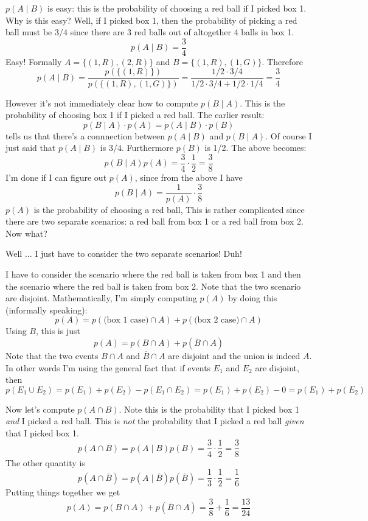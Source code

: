 $p(A\mid B)$ is easy: this is the probability of choosing a red ball if 
I picked box 1.
Why is this easy? Well, if I picked box 1,
then the probability of picking a red
ball must be $3/4$ since there are 3 red balls out of altogether 4 
balls in box 1.
\[
p(A \mid B) = \frac{3}{4}
\]
Easy!
Formally
$A = \{(1, R), (2, R)\}$
and $B = \{(1, R), (1, G)\}$.
Therefore
\[
p(A \mid B) = \frac{p(\{(1, R)\})}{p(\{(1, R), (1, G)\})}
= \frac{1/2 \cdot 3/4}{1/2 \cdot 3/4 + 1/2 \cdot 1/4}
= \frac{3}{4}
\]




However it's not immediately clear how to compute $p(B\mid A)$.
This is the probability of choosing box 1 if I picked a red ball.
The earlier result:
\[
p(B \mid  A) \cdot p(A)
=
p(A \mid  B) \cdot p(B) 
\]
tells us that there's a connnection between $p(A\mid B)$ and $p(B\mid A)$.
Of course I just said that $p(A\mid B)$ is $3/4$.
Furthermore $p(B)$ is 1/2.
The above becomes:
\[
p(B \mid  A) p(A)
= 
\frac{3}{4} \cdot \frac{1}{2} = \frac{3}{8}
\]
I'm done if I can figure out $p(A)$, since from the above I have
\[
p(B \mid  A)
= 
\frac{1}{p(A)} \cdot \frac{3}{8}
\]
$p(A)$ is the probability of choosing a red ball,
This is rather complicated since there are two separate scenarios:
a red ball from box 1 or a red ball from box 2.
Now what?

Well ... I just have to consider the two separate scenarios! Duh!

I have to consider the scenario where the red ball is taken from box 1
and then the scenario where the red ball is taken from box 2.
Note that the two scenario are disjoint.
Mathematically, I'm simply computing $p(A)$ 
by doing this (informally speaking):
\[
p(A) = p(\text{(box 1 case)} \cap A) + p(\text{(box 2 case)} \cap A)
\] 
Using $B$, this is just
\[
p(A) = p(B \cap A) + p(\overline B \cap A) 
\] 
Note that the two events 
$B \cap A$ and 
$\overline B \cap A$
are disjoint and the union is indeed $A$.
In other words I'm using the general fact that if events 
$E_1$ and $E_2$ are disjoint, then
\[
p(E_1 \cup E_2) 
= p(E_1) + p(E_2) - p(E_1 \cap E_2) 
= p(E_1) + p(E_2) - 0
= p(E_1) + p(E_2)
\]

Now let's compute $p(A \cap B)$.
Note this is the probability that I picked box 1 
\textit{and} I picked a red ball.
This is \textit{not} the probability that I picked a red ball
\textit{given} that I picked box 1.
\[
p(A \cap B) = p(A\mid B) p(B) = \frac{3}{4} \cdot \frac{1}{2} = \frac{3}{8}
\]
The other quantity is
\[
p(A \cap \overline B) 
= p(A\mid \overline B) p(\overline B) 
= \frac{1}{3} \cdot \frac{1}{2} = \frac{1}{6}
\]
Putting things together we get
\[
p(A) = p(B \cap A) + p(\overline B \cap A) = \frac{3}{8} + \frac{1}{6}
= \frac{13}{24} 
\] 


